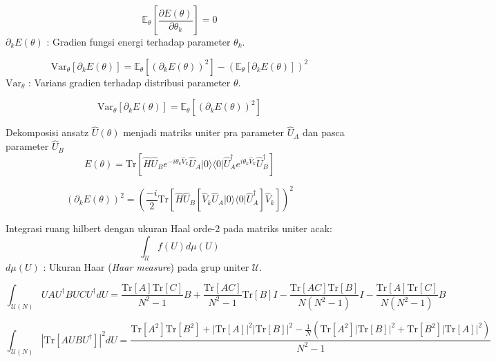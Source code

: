 \begin{equation}
    \mathbb{E}_{\theta} \left[ \frac{\partial E(\theta)}{\partial \theta_k} \right] = 0
\end{equation}
$\partial_k E(\theta)$ : Gradien fungsi energi terhadap parameter $\theta_k$.

\begin{equation}
    \text{Var}_{\theta} \left[ \partial_k E(\theta) \right] = \mathbb{E}_{\theta} \left[ \left( \partial_k E(\theta) \right)^2 \right] - \left( \mathbb{E}_{\theta} \left[ \partial_k E(\theta) \right] \right)^2
\end{equation}
$\text{Var}_{\theta}$ : Varians gradien terhadap distribusi parameter $\theta$.

\begin{equation}
    \text{Var}_{\theta} \left[ \partial_k E(\theta) \right] = \mathbb{E}_{\theta} \left[ \left( \partial_k E(\theta) \right)^2 \right]
\end{equation}

Dekomposisi ansatz $\hat{U}(\theta)$ menjadi matriks uniter pra parameter $\hat{U}_A$ dan pasca parameter $\hat{U}_B$
\begin{equation}
    E(\theta) = \text{Tr}\left[ \hat{H} \hat{U}_B e^{-i \theta_k \hat{V}_k} \hat{U}_A |0\rangle \langle 0| \hat{U}_A^\dagger e^{i \theta_k \hat{V}_k} \hat{U}_B^\dagger \right]
\end{equation}

\begin{equation}
    \left(\partial_k E(\theta)\right)^2 = \left( \frac{-i}{2} \text{Tr} \left[\hat{H} \hat{U}_B \left[\hat{V}_k \hat{U}_A |0\rangle \langle 0| \hat{U}_A^\dagger\right] \hat{V}_k\right] \right)^2
\end{equation}

Integrasi ruang hilbert dengan ukuran Haal orde-2 pada matriks uniter acak:
\begin{equation}
    \int_{\mathcal{U}} f(U) d\mu(U)
\end{equation}
$d\mu(U)$ : Ukuran Haar (\textit{Haar measure}) pada grup uniter $\mathcal{U}$.

\begin{equation}
    \int_{\mathcal{U}(N)} U A U^\dagger B U C U^\dagger dU = \frac{\text{Tr}[A]\text{Tr}[C]}{N^2-1} B + \frac{\text{Tr}[AC]}{N^2-1} \text{Tr}[B] I - \frac{\text{Tr}[AC]\text{Tr}[B]}{N(N^2-1)} I - \frac{\text{Tr}[A]\text{Tr}[C]}{N(N^2-1)} B
\end{equation}

\begin{equation}
    \int_{\mathcal{U}(N)} |\text{Tr}[A U B U^\dagger]|^2 dU = \frac{\text{Tr}[A^2]\text{Tr}[B^2] + |\text{Tr}[A]|^2|\text{Tr}[B]|^2 - \frac{1}{N}(\text{Tr}[A^2]|\text{Tr}[B]|^2 + \text{Tr}[B^2]|\text{Tr}[A]|^2)}{N^2-1}
\end{equation}

